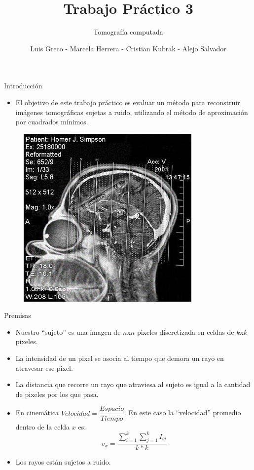 \documentclass[11pt]{beamer}
\author{Luis Greco - Marcela Herrera - Cristian Kubrak - Alejo Salvador }
\title{Trabajo Práctico 3}
\subtitle{Tomografía computada}
\begin{document}
\begin{frame}
\titlepage 
\end{frame}


\begin{frame}{Introducción}
\begin{itemize}
\item El objetivo de este trabajo práctico es evaluar un método para reconstruir imágenes tomográficas sujetas a ruido, utilizando el método de aproximación por cuadrados mínimos.
\end{itemize}
\begin{figure}[H]
    \centering
    \includegraphics[scale=0.4]{img/photo_2018-07-05_14-34-53.jpg}
    \label{fig:homero}
\end{figure}
\end{frame}

\begin{frame}{Premisas}
\begin{itemize}
\item Nuestro “sujeto” es una imagen de $n$x$n$ pixeles discretizada en celdas de $k$x$k$ pixeles.
\item La intensidad de un pixel se asocia al tiempo que demora un rayo en atravesar ese pixel.
\item La distancia que recorre un rayo que atraviesa al sujeto es igual a la cantidad de pixeles por los que pasa.
\item En cinemática $Velocidad = \dfrac{Espacio}{Tiempo}$. En este caso la “velocidad” promedio dentro de la celda $x$ es:
\begin{displaymath}
v_{x} =\dfrac{\sum_{i=1}^{k}\sum_{j=1}^{k} I_{ij}}{k*k}
\end{displaymath}
\item Los rayos están sujetos a ruido.
\end{itemize}
\end{frame}
\end{document}

